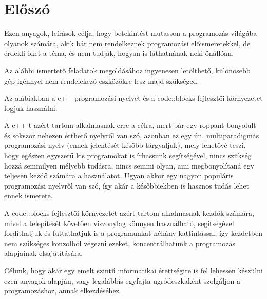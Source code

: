 \chapter{Előszó} %
\label{ch:intro}

Ezen anyagok, leírások célja, hogy betekintést mutasson a programozás világába olyanok számára, akik bár nem rendelkeznek programozási előismeretekkel, de érdekli őket a téma, és nem tudják, hogyan is láthatnának neki önállóan.

Az alábbi ismertető feladatok megoldásához ingyenesen letölthető, különösebb gép igénnyel nem rendelekező eszközökre lesz majd szükséged.

Az alábiakban a c++ programozási nyelvet és a code::blocks fejlesztői környezetet fogjuk használni.

A c++-t azért tartom alkalmasnak erre a célra, mert bár egy roppant bonyolult és sokszor nehezen érthető nyelvről van szó, azonban ez egy ún. multiparadigmás programozási nyelv (ennek jelentését később tárgyaljuk), mely lehetővé teszi, hogy egészen egyszerű kis programokat is írhassunk segítségével, nincs szükség hozzá semmilyen mélyebb tudásra, nincs semmi olyan, ami megbonyolítaná egy teljesen kezdő számára a használatot. Ugyan akkor egy nagyon populáris programozási nyelvről van szó, így akár a későbbiekben is hasznos tudás lehet ennek ismerete. 

A code::blocks fejlesztői környezetet azért tartom alkalmasnak kezdők számára, mivel a telepítését követően viszonylag könnyen használható, segítségével fordíthatjuk és futtathatjuk is a programunkat néhány kattintással, így kezdetben nem szükséges konzolból végezni ezeket, koncentrálhatunk a programozás alapjainak elsajátítására.

Célunk, hogy akár egy emelt szintű informatikai érettségire is fel lehessen készülni ezen anyagok alapján, vagy legalábbis egyfajta ugródeszkaként szolgáljon a programozáshoz, annak elkezdéséhez.